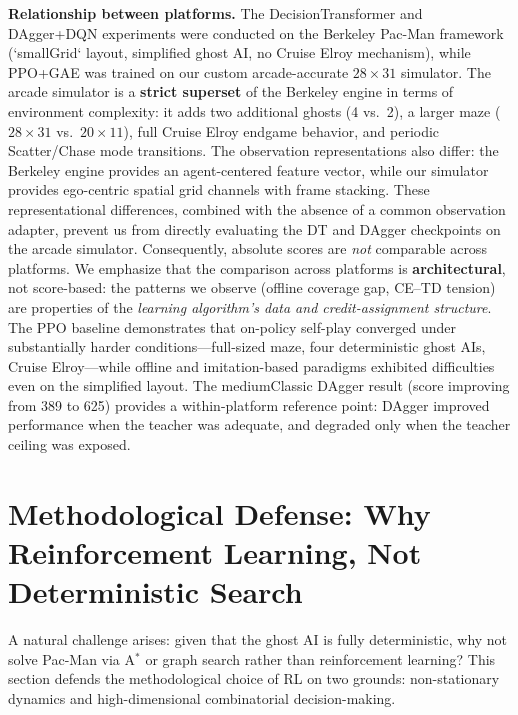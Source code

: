 \documentclass[11pt,a4paper]{article}
\theoremstyle{definition}
\begin{document}
\textbf{Relationship between platforms.}
The DecisionTransformer and DAgger+DQN experiments were conducted on the Berkeley Pac-Man framework (`smallGrid` layout, simplified ghost AI, no Cruise Elroy mechanism), while PPO+GAE was trained on our custom arcade-accurate $28\times 31$ simulator.
The arcade simulator is a \textbf{strict superset} of the Berkeley engine in terms of environment complexity: it adds two additional ghosts (4 vs.\ 2), a larger maze ($28\times31$ vs.\ $20\times11$), full Cruise Elroy endgame behavior, and periodic Scatter/Chase mode transitions.
The observation representations also differ: the Berkeley engine provides an agent-centered feature vector, while our simulator provides ego-centric spatial grid channels with frame stacking.
These representational differences, combined with the absence of a common observation adapter, prevent us from directly evaluating the DT and DAgger checkpoints on the arcade simulator.
Consequently, absolute scores are \textit{not} comparable across platforms.
We emphasize that the comparison across platforms is \textbf{architectural}, not score-based: the patterns we observe (offline coverage gap, CE--TD tension) are properties of the \textit{learning algorithm's data and credit-assignment structure}.
The PPO baseline demonstrates that on-policy self-play converged under substantially harder conditions---full-sized maze, four deterministic ghost AIs, Cruise Elroy---while offline and imitation-based paradigms exhibited difficulties even on the simplified layout.
The mediumClassic DAgger result (score improving from 389 to 625) provides a within-platform reference point: DAgger improved performance when the teacher was adequate, and degraded only when the teacher ceiling was exposed.
\label{sec:observations}

\section{Methodological Defense: Why Reinforcement Learning, Not Deterministic Search}

A natural challenge arises: given that the ghost AI is fully deterministic, why not solve Pac-Man via A$^*$ or graph search rather than reinforcement learning?
This section defends the methodological choice of RL on two grounds: non-stationary dynamics and high-dimensional combinatorial decision-making.
\end{document}
